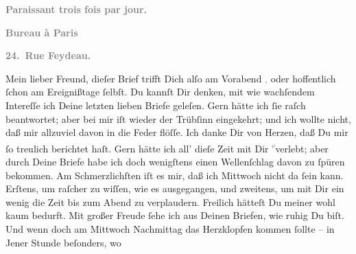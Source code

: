 \begin{ledgroupsized}[t]{13cm}
           \pstart
           \begin{otherlanguage}{french}\textcolor{gray}{\textbf{\textbf{Paraissant trois fois par jour.}}}\end{otherlanguage}\pend
           \pstart
           \begin{otherlanguage}{french}\textcolor{gray}{\textbf{\textbf{Bureau à Paris}}}\end{otherlanguage}\pend
           \pstart
           \begin{otherlanguage}{french}\textcolor{gray}{\textbf{\textbf{24. Rue Feydeau.}}}\end{otherlanguage}\pend
           \pstart\center{}Mein lieber Freund,\pend\pstart
           dieſer Brief trifft Dich alſo am Vorabend{ }\label{K_L02750-1v}\label{K_L02750-1h}\textcolor{gray}{,} oder hoffentlich ſchon am Ereignißtage ſelbſt. Du kannſt Dir denken, mit wie wachſendem Intereſſe
               ich Deine letzten lieben Briefe geleſen. Gern hätte ich ſie raſch beantwortet; aber
               bei mir iſt wieder der Trübſinn eingekehrt; und ich wollte nicht, daß mir allzuviel
               davon in die Feder flöſſe. Ich danke Dir \strikeout{\textcolor{gray}{v}} von Herzen, daß Du mir ſo treulich berichtet haſt. Gern  hätte ich all’ dieſe Zeit {\pb}mit Dir \substVorne{}\textsuperscript{\textcolor{gray}{e}}\substDazwischen{}v\substHinten{}erlebt; aber durch Deine Briefe habe ich doch wenigſtens einen Wellenſchlag
               davon zu ſpüren bekommen. Am \strikeout{\textcolor{gray}{S}\textcolor{gray}{×}\-\textcolor{gray}{×}\-\textcolor{gray}{×}\-\textcolor{gray}{×}\-\textcolor{gray}{×}\textcolor{gray}{ſten}} Schmerzlichſten iſt es mir, daß ich Mittwoch
               nicht da ſein kann. Erſtens, um raſcher zu wiſſen, wie es ausgegangen, und zweitens,
               um  mit Dir ein wenig die Zeit bis zum Abend zu verplaudern. Freilich
               hätteſt Du meiner wohl kaum bedurft. Mit großer Freude ſehe ich aus Deinen Briefen,
               wie ruhig Du biſt. Und wenn doch am Mittwoch{ }Nachmittag das Herzklopfen kommen ſollte – in Jener Stunde beſonders, wo

\end{ledgroupsized}
